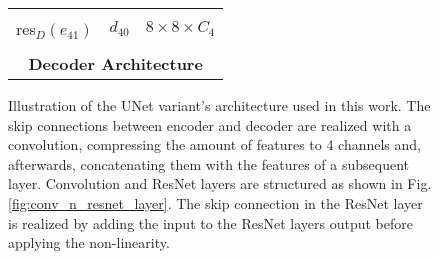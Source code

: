 \begin{figure}[H]
\begin{minipage}{0.55\textwidth}
\begin{tabular}{l|c|l}
			\hline
			&&\\
			res$_D(e_{41})$ & $d_{40}$ & $8 \times 8 \times C_4$\\
			\multicolumn{3}{c}{}             \\
			\multicolumn{3}{c}{\textbf{Decoder Architecture}} \\
		\end{tabular}
	\end{minipage}
\caption{\label{fig:std_unet}Illustration of the UNet variant's architecture used in this work. The skip connections between encoder and decoder are realized with a convolution, compressing the amount of features to 4 channels and, afterwards, concatenating them with the features of a subsequent layer. Convolution and ResNet layers are structured as shown in Fig. \ref{fig:conv_n_resnet_layer}. The skip connection in the ResNet layer is realized by adding the input to the ResNet layers output before applying the non-linearity.}
\end{figure}
%
